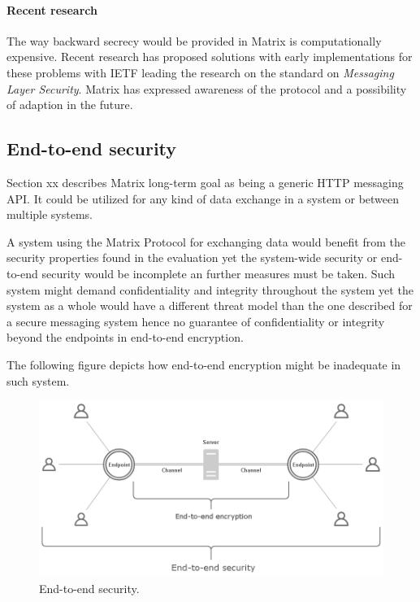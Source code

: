 \paragraph{Recent research}
The way backward secrecy would be provided in Matrix is computationally expensive. Recent research has proposed solutions with early implementations for these problems with IETF leading the research on the standard on \emph{Messaging Layer Security}. Matrix has expressed awareness of the protocol and a possibility of adaption in the future.

\subsection{End-to-end security} \label{endtoend}

Section xx describes Matrix long-term goal as being a generic HTTP messaging API. It could be utilized for any kind of data exchange in a system or between multiple systems.

A system using the Matrix Protocol for exchanging data would benefit from the security properties found in the evaluation yet the system-wide security or end-to-end security would be incomplete an further measures must be taken. Such system might demand confidentiality and integrity throughout the system yet the system as a whole would have a different threat model than the one described for a secure messaging system hence no guarantee of confidentiality or integrity beyond the endpoints in end-to-end encryption. 

The following figure depicts how end-to-end encryption might be inadequate in such system. 

\begin{figure}[H]
	\centering
	\includegraphics[width=12cm]{figures/e2esecurity.png}
	\caption{End-to-end security.}
	\label{fig:e2esecurity}
\end{figure}

